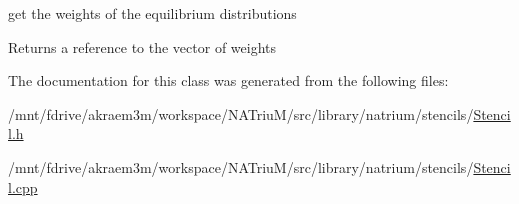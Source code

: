 get the weights of the equilibrium distributions \begin{DoxyReturn}{Returns}
a reference to the vector of weights 
\end{DoxyReturn}


The documentation for this class was generated from the following files:\begin{DoxyCompactItemize}
\item 
/mnt/fdrive/akraem3m/workspace/NATriuM/src/library/natrium/stencils/\hyperlink{Stencil_8h}{Stencil.h}\item 
/mnt/fdrive/akraem3m/workspace/NATriuM/src/library/natrium/stencils/\hyperlink{Stencil_8cpp}{Stencil.cpp}\end{DoxyCompactItemize}
